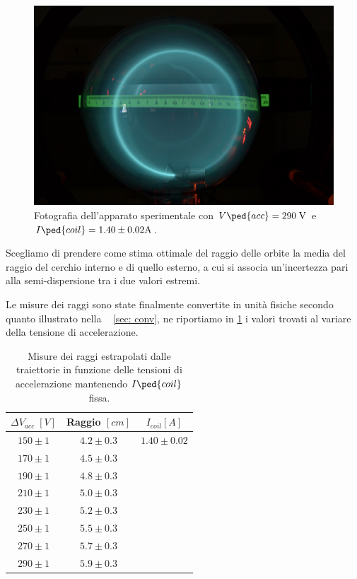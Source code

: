 \documentclass[10pt, a4paper, italian]{article}
\begin{document}
\begin{figure}[htbp]
\includegraphics[width=\textwidth]{DSC_0120}
\caption{Fotografia dell'apparato sperimentale con $V\ped{acc} = 290 \; \si{V}$
e $I\ped{coil} = 1.40 \pm 0.02 \si{A}$.
\label{fig: fot}}
\end{figure}
Scegliamo di prendere come stima ottimale del raggio delle orbite la
media del raggio del cerchio interno e di quello esterno, a cui si associa
un'incertezza pari alla semi-dispersione tra i due valori estremi.

Le misure dei raggi sono state finalmente convertite in unità fisiche secondo
quanto illustrato nella ~ \cref{sec: conv}, ne riportiamo in
\cref{tab: IVrad} i valori trovati al variare della tensione di accelerazione.
\begin{table}[htbp]
\centering
\begin{tabular}{cc|c}
\toprule
$\Delta V_{acc} \; [\si{V}]$ & Raggio $[\si{cm}]$ & $I_{coil} [A]$ \\
\midrule
$150 \pm 1$ & $4.2 \pm 0.3$ & $1.40 \pm 0.02$\\
$170 \pm 1$ & $4.5 \pm 0.3$ & \\
$190 \pm 1$ & $4.8 \pm 0.3$ & \\
$210 \pm 1$ & $5.0 \pm 0.3$ & \\
$230 \pm 1$ & $5.2 \pm 0.3$ & \\
$250 \pm 1$ & $5.5 \pm 0.3$ & \\
$270 \pm 1$ & $5.7 \pm 0.3$ & \\
$290 \pm 1$ & $5.9 \pm 0.3$ & \\
\bottomrule
\end{tabular}
\caption{Misure dei raggi estrapolati dalle traiettorie in funzione delle
tensioni di accelerazione mantenendo $I\ped{coil}$ fissa.
\label{tab: IVrad}}
\end{table}
\end{document}
